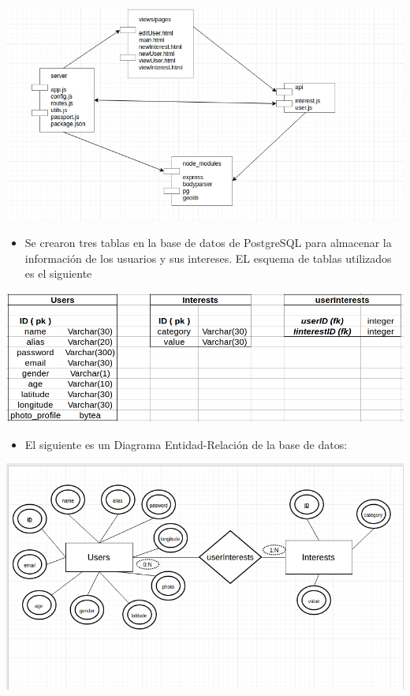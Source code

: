 \documentclass[letterpaper,10pt,english]{sphinxmanual}
\begin{document}
\includegraphics{componentes3Shared.png}
\begin{itemize}
\item {} 
Se crearon tres tablas en la base de datos de PostgreSQL para almacenar la información de los usuarios y sus intereses. EL esquema de tablas utilizados es el siguiente

\end{itemize}

\includegraphics{tablasShared.png}
\begin{itemize}
\item {} 
El siguiente es un Diagrama Entidad-Relación de la base de datos:

\end{itemize}

\includegraphics{derShared.png}
\end{document}
